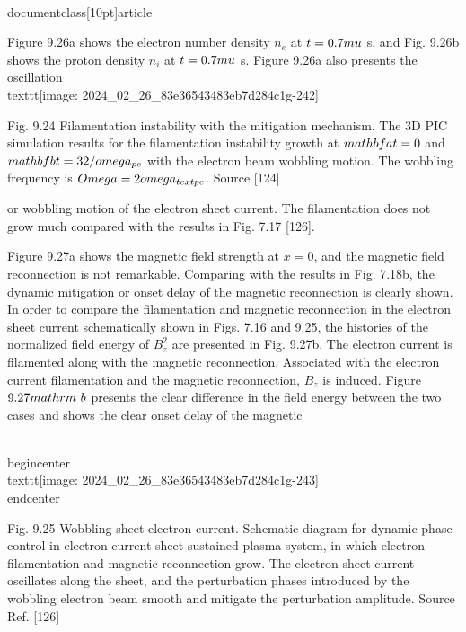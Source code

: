 \\documentclass[10pt]{article}
\begin{document}
{{{{{{Figure 9.26a shows the electron number density $n_{e}$ at $t=0.7 \\mu$ s, and Fig. 9.26b shows the proton density $n_{i}$ at $t=0.7 \\mu$ s. Figure 9.26a also presents the oscillation
\\texttt{[image: 2024\_02\_26\_83e36543483eb7d284c1g-242]}

Fig. 9.24 Filamentation instability with the mitigation mechanism. The 3D PIC simulation results for the filamentation instability growth at $\\mathbf{a} t=0$ and $\\mathbf{b} t=32 / \\omega_{p e}$ with the electron beam wobbling motion. The wobbling frequency is $\\Omega=2 \\omega_{\\text {pe }}$. Source [124]

or wobbling motion of the electron sheet current. The filamentation does not grow much compared with the results in Fig. 7.17 [126].

Figure 9.27a shows the magnetic field strength at $x=0$, and the magnetic field reconnection is not remarkable. Comparing with the results in Fig. 7.18b, the dynamic mitigation or onset delay of the magnetic reconnection is clearly shown. In order to compare the filamentation and magnetic reconnection in the electron sheet current schematically shown in Figs. 7.16 and 9.25, the histories of the normalized field energy of $B_{z}^{2}$ are presented in Fig. 9.27b. The electron current is filamented along with the magnetic reconnection. Associated with the electron current filamentation and the magnetic reconnection, $B_{z}$ is induced. Figure $9.27 \\mathrm{~b}$ presents the clear difference in the field energy between the two cases and shows the clear onset delay of the magnetic

\\begin{center}
\\texttt{[image: 2024\_02\_26\_83e36543483eb7d284c1g-243]}
\\end{center}

Fig. 9.25 Wobbling sheet electron current. Schematic diagram for dynamic phase control in electron current sheet sustained plasma system, in which electron filamentation and magnetic reconnection grow. The electron sheet current oscillates along the sheet, and the perturbation phases introduced by the wobbling electron beam smooth and mitigate the perturbation amplitude. Source Ref. [126]

}}}}}}
\end{document}
